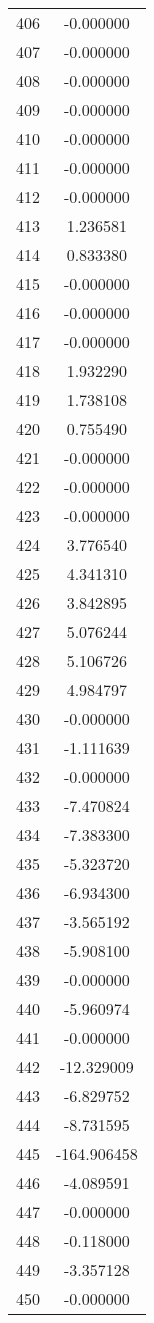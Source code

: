 \documentclass[12pt]{article}
\begin{document}
\begin{longtable}{@{}cc@{}}
406 & -0.000000 \\
407 & -0.000000 \\
408 & -0.000000 \\
409 & -0.000000 \\
410 & -0.000000 \\
411 & -0.000000 \\
412 & -0.000000 \\
413 & 1.236581 \\
414 & 0.833380 \\
415 & -0.000000 \\
416 & -0.000000 \\
417 & -0.000000 \\
418 & 1.932290 \\
419 & 1.738108 \\
420 & 0.755490 \\
421 & -0.000000 \\
422 & -0.000000 \\
423 & -0.000000 \\
424 & 3.776540 \\
425 & 4.341310 \\
426 & 3.842895 \\
427 & 5.076244 \\
428 & 5.106726 \\
429 & 4.984797 \\
430 & -0.000000 \\
431 & -1.111639 \\
432 & -0.000000 \\
433 & -7.470824 \\
434 & -7.383300 \\
435 & -5.323720 \\
436 & -6.934300 \\
437 & -3.565192 \\
438 & -5.908100 \\
439 & -0.000000 \\
440 & -5.960974 \\
441 & -0.000000 \\
442 & -12.329009 \\
443 & -6.829752 \\
444 & -8.731595 \\
445 & -164.906458 \\
446 & -4.089591 \\
447 & -0.000000 \\
448 & -0.118000 \\
449 & -3.357128 \\
450 & -0.000000 \\

\end{longtable}
\end{document}
